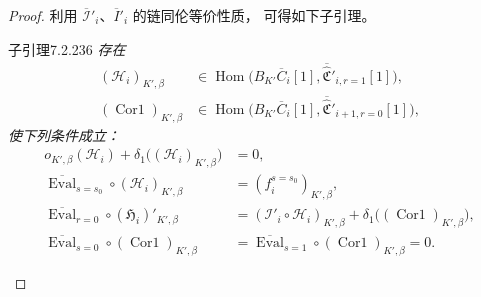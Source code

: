 \begin{proof}
利用 $\overline{\mathcal I}'_i$、$\overline I'_i$ 的链同伦等价性质，
可得如下子引理。

\begin{statement}{子引理}{7.2.236}\label{sublem:7-2-236}\itshape
存在
\[
\begin{aligned}
(\mathcal H_i)_{K',\beta}
&\in\operatorname{Hom}\bigl(
B_{K'}\overline C_i[1],
\overline{\widehat{\mathfrak C}}'_{i,r=1}[1]
\bigr),\\
(\operatorname{Cor1})_{K',\beta}
&\in\operatorname{Hom}\bigl(
B_{K'}\overline C_i[1],
\overline{\widehat{\mathfrak C}}'_{i+1,r=0}[1]
\bigr),
\end{aligned}
\]
使下列条件成立：
\begin{align}
o_{K',\beta}(\mathcal H_i)
+\delta_1\bigl((\mathcal H_i)_{K',\beta}\bigr)
&=0,
\tag{7.2.237.1}\label{eq:7-2-237-1}\\
\overline{\operatorname{Eval}}_{s=s_0}\circ
(\mathcal H_i)_{K',\beta}
&=(f_i^{s=s_0})_{K',\beta},
\tag{7.2.237.2}\label{eq:7-2-237-2}\\
\overline{\operatorname{Eval}}_{r=0}\circ
(\mathfrak H_i)'_{K',\beta}
&=(\mathcal I'_i\circ\mathcal H_i)_{K',\beta}
+\delta_1\bigl((\operatorname{Cor1})_{K',\beta}\bigr),
\tag{7.2.237.3}\label{eq:7-2-237-3}\\
\overline{\operatorname{Eval}}_{s=0}\circ
(\operatorname{Cor1})_{K',\beta}
&=\overline{\operatorname{Eval}}_{s=1}\circ
(\operatorname{Cor1})_{K',\beta}=0.
\tag{7.2.237.4}\label{eq:7-2-237-4}
\end{align}
\end{statement}


\end{proof}
